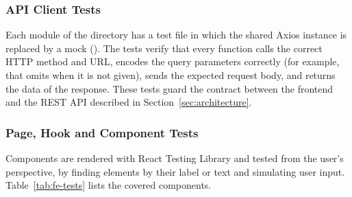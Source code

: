 \subsubsection*{API Client Tests}

Each module of the  directory has a test file in which the shared Axios
instance is replaced by a mock (). The tests verify that every
function calls the correct HTTP method and URL, encodes the query parameters correctly
(for example, that  omits  when it is not given), sends
the expected request body, and returns the data of the response. These tests guard the
contract between the frontend and the REST API described in Section~\ref{sec:architecture}.

\subsubsection*{Page, Hook and Component Tests}

Components are rendered with React Testing Library and tested from the user's
perspective, by finding elements by their label or text and simulating user input.
Table~\ref{tab:fe-tests} lists the covered components.

